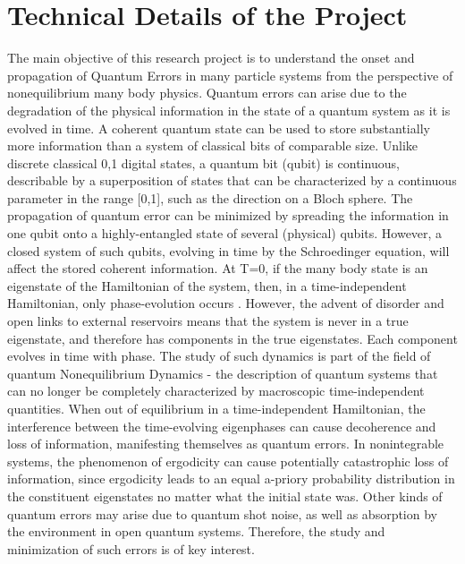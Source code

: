 \documentclass[a4paper,9pt]{article}
\begin{document}
\section{Technical Details of the Project}
The main objective of this research project is to understand the onset and propagation of Quantum Errors in many particle systems from the perspective of nonequilibrium many body physics. Quantum errors can arise due to the degradation of the physical information in the state of a quantum system as it is evolved in time. A coherent quantum state can be used to store substantially more information than a system of classical bits of comparable size. Unlike discrete classical 0,1 digital states, a quantum bit (qubit) is continuous, describable by a superposition of states that can be characterized by a continuous parameter in the range [0,1], such as the direction on a Bloch sphere. The propagation of quantum error can be minimized by spreading the information in one qubit onto a highly-entangled state of several (physical) qubits.   However, a closed system of such qubits, evolving in time by the Schroedinger equation, will affect the stored coherent information. At  T=0, if the many body state is an eigenstate of the Hamiltonian of the system, then, in a time-independent Hamiltonian, only phase-evolution occurs . However, the advent of disorder and open links to external reservoirs means that the system is never in a true eigenstate, and therefore has components in the true eigenstates. Each component evolves in time with phase. The study of such dynamics is part of the field of quantum Nonequilibrium Dynamics - the description of quantum systems that can no longer be completely characterized by macroscopic time-independent quantities. When out of equilibrium in a time-independent Hamiltonian, the interference between the time-evolving eigenphases can cause decoherence and loss of information, manifesting themselves as quantum errors. In nonintegrable systems, the phenomenon of ergodicity can cause potentially catastrophic loss of information, since ergodicity leads to an equal a-priory probability distribution in the constituent eigenstates no matter what the initial state was. Other kinds of quantum errors may arise due to quantum shot noise, as well as absorption by the environment in open quantum systems. Therefore, the study and minimization of such errors is of key interest.
\end{document}
